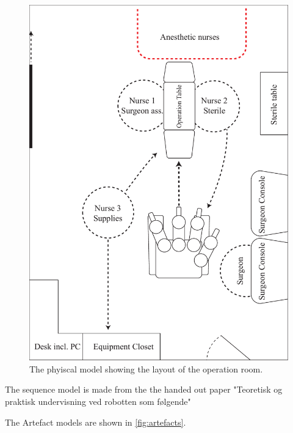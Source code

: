 \documentclass[paper=a4, fontsize=11pt]{scrartcl} %
\numberwithin{equation}{section} %
\numberwithin{figure}{section} %
\numberwithin{table}{section} %
\begin{document}
\begin{figure}
	\centering
	\includegraphics[width=\textwidth]{physical}
	\caption{The phyiscal model showing the layout of the operation room.}
	\label{fig:layout}
\end{figure}

The sequence model is made from the the handed out paper "Teoretisk og praktisk undervisning ved robotten som følgende"

The Artefact models are shown in \autoref{fig:artefacts}.
\end{document}
